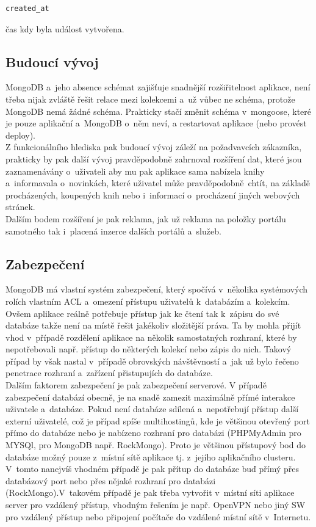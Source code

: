 \documentclass[a4paper,12pt,twoside,BCOR=10mm]{article}
\newenvironment{codeframe}{%
  \begin{Sbox} 
    \begin{minipage} 
      {\columnwidth-\leftmargin-\rightmargin-2\fboxsep-2\fboxrule-4pt} 
}{%

  \end{minipage} 
  \end{Sbox} 
  \begin{center} 
    \fcolorbox{black}{codeback}{\TheSbox} 
  \end{center} 
}
\begin{document}
\begin{codeframe}
  \begin{verbatim}
created_at
  \end{verbatim}
\end{codeframe}
čas kdy byla událost vytvořena.

\subsection{Budoucí vývoj}
MongoDB a~jeho absence schémat zajišťuje snadnější rozšiřitelnost aplikace, není třeba nijak zvláště řešit relace mezi kolekcemi a~už vůbec ne schéma, protože MongoDB nemá žádné schéma. Prakticky stačí změnit schéma v~mongoose, které je pouze aplikační a~MongoDB o~něm neví, a restartovat aplikace (nebo provést deploy).\\

Z funkcionálního hlediska pak budoucí vývoj záleží na požadvavcích zákazníka, prakticky by pak další vývoj pravděpodobně zahrnoval rozšíření dat, které jsou zaznamenávány o~uživateli aby mu pak aplikace sama nabízela knihy a~informavala o~novinkách, které uživatel může pravděpodobně chtít, na základě procházených, koupených knih nebo i~informací o~procházení jiných webových stránek.\\

Dalším bodem rozšíření je pak reklama, jak už reklama na položky portálu samotného tak i~placená inzerce dalších portálů a~služeb.\\

\subsection{Zabezpečení}
MongoDB má vlastní systém zabezpečení, který spočívá v~několika systémových rolích vlastním ACL a~omezení přístupu uživatelů k~databázím a~kolekcím. Ovšem aplikace reálně potřebuje přístup jak ke čtení tak k~zápisu do své databáze takže není na místě řešit jakékoliv složitější práva. Ta by mohla přijít vhod v~případě rozdělení aplikace na několik samostatných rozhraní, které by nepotřebovali např. přístup do některých kolekcí nebo zápis do nich. Takový případ by však nastal v~případě obrovských návštěvností a~jak už bylo řečeno penetrace rozhraní a~zařízení přistupujích do databáze.\\

Dalším faktorem zabezpečení je pak zabezpečení serverové. V případě zabezpečení databází obecně, je na snadě zamezit maximálně přímé interakce uživatele a~databáze. Pokud není databáze sdílená a~nepotřebují přístup další externí uživatelé, což je případ spíše multihostingů, kde je většinou otevřený port přímo do databáze nebo je nabízeno rozhraní pro databázi (PHPMyAdmin pro MYSQl, pro MongoDB např. RockMongo). Proto je většinou přístupový bod do databáze možný pouze z~místní sítě aplikace tj. z~jejího aplikačního clusteru. V~tomto nanejvíš vhodném případě je pak přítup do databáze buď přímý přes databázový port nebo přes nějaké rozhraní pro databázi (RockMongo).V~takovém případě je pak třeba vytvořit v~místní síti aplikace server pro vzdálený přístup, vhodným řešením je např. OpenVPN nebo jiný SW pro vzdálený přístup nebo připojení počítače do vzdálené místní sítě v~Internetu.
\end{document}
